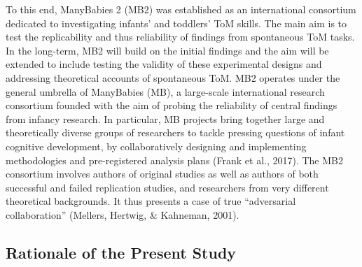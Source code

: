 \documentclass[
  man,floatsintext]{apa6}
\begin{document}
To this end, ManyBabies 2 (MB2) was established as an international consortium dedicated to investigating infants' and toddlers' ToM skills. The main aim is to test the replicability and thus reliability of findings from spontaneous ToM tasks. In the long-term, MB2 will build on the initial findings and the aim will be extended to include testing the validity of these experimental designs and addressing theoretical accounts of spontaneous ToM. MB2 operates under the general umbrella of ManyBabies (MB), a large-scale international research consortium founded with the aim of probing the reliability of central findings from infancy research. In particular, MB projects bring together large and theoretically diverse groups of researchers to tackle pressing questions of infant cognitive development, by collaboratively designing and implementing methodologies and pre-registered analysis plans (Frank et al., 2017). The MB2 consortium involves authors of original studies as well as authors of both successful and failed replication studies, and researchers from very different theoretical backgrounds. It thus presents a case of true ``adversarial collaboration'' (Mellers, Hertwig, \& Kahneman, 2001).

\subsection{Rationale of the Present Study}\label{rationale-of-the-present-study}
\end{document}
